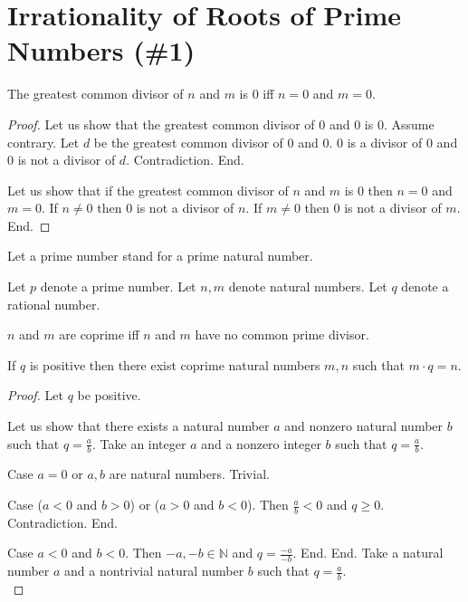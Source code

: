 \documentclass{article}
\begin{document}
\section{Irrationality of Roots of Prime Numbers (\#1)}

\begin{forthel}

\begin{lemma}
The greatest common divisor of $n$ and $m$ is 0 iff $n = 0$ and $m = 0$.
\end{lemma}
\begin{proof}
Let us show that the greatest common divisor of 0 and 0 is 0.
  Assume contrary. Let $d$ be the greatest common divisor of 0 and 0. 
  0 is a divisor of 0 and 0 is not a divisor of $d$. Contradiction. End.

Let us show that if the greatest common divisor of $n$ and $m$ is 0 then $n = 0$ and $m = 0$.
  If $n \neq 0$ then 0 is not a divisor of $n$.
  If $m \neq 0$ then 0 is not a divisor of $m$.
End.
\end{proof}

  Let a prime number stand for a prime natural number.

    Let $p$ denote a prime number.
    Let $n,m$ denote natural numbers.
    Let $q$ denote a rational number.

    \begin{definition}
      $n$ and $m$ are coprime iff $n$ and $m$ have no common prime divisor.
    \end{definition}

    \begin{lemma}
      If $q$ is positive then there exist coprime natural numbers $m,n$ such that $m \cdot q = n$.
    \end{lemma}
\begin{proof}
Let $q$ be positive. 

Let us show that there exists a natural number $a$ and nonzero natural number $b$ such that $q = \frac{a}{b}$.
  Take an integer $a$ and a nonzero integer $b$ such that $q = \frac{a}{b}$.
  
  Case $a = 0$ or $a,b$ are natural numbers. Trivial.
  
  Case ($a < 0$ and $b > 0$) or ($a > 0$ and $b < 0$). Then $\frac{a}{b} < 0$ and $q \geq 0$. Contradiction. End.
  
  Case $a < 0$ and $b < 0$. Then $-a,-b \in \mathbb{N}$ and $q = \frac{-a}{-b}$. End.
End.
Take a natural number $a$ and a nontrivial natural number $b$ such that $q = \frac{a}{b}$.\\


\end{proof}
\end{forthel}
\end{document}
